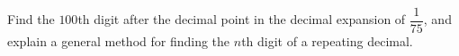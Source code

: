 Find the $100$th digit after the decimal point in the decimal expansion of $\dfrac{1}{75}$, and explain a general method for finding the $n$th digit of a repeating decimal.
